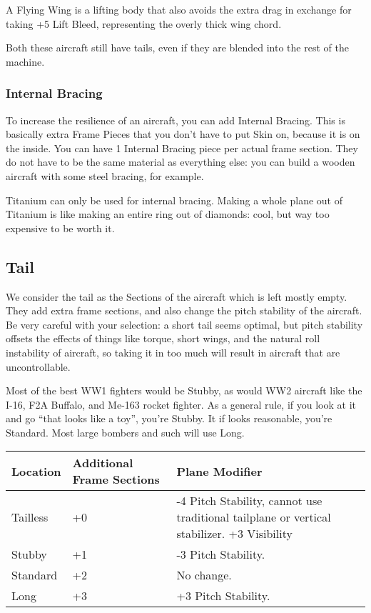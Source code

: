 \documentclass{article}
\begin{document}
A Flying Wing is a lifting body that also avoids the extra drag
in exchange for taking +5 Lift Bleed, representing the overly thick wing
chord.

Both these aircraft still have tails, even if they are blended
into the rest of the machine.

\subsubsection{Internal Bracing}
\label{_Internal Bracing}

To increase the resilience of an aircraft, you can add Internal Bracing.
This is basically extra Frame Pieces that you don't have to put Skin on,
because it is on the inside. You can have 1 Internal Bracing piece per
actual frame section. They do not have to be the same material as
everything else: you can build a wooden aircraft with some steel
bracing, for example.

Titanium can only be used for internal bracing. Making a whole plane out
of Titanium is like making an entire ring out of diamonds: cool, but way
too expensive to be worth it.

\subsection{Tail}
\label{_Tail}

We consider the tail as the Sections of the aircraft which is left
mostly empty. They add extra frame sections, and also change the pitch
stability of the aircraft. Be very careful with your selection: a short
tail seems optimal, but pitch stability offsets the effects of things
like torque, short wings, and the natural roll instability of aircraft,
so taking it in too much will result in aircraft that are
uncontrollable.

Most of the best WW1 fighters would be Stubby, as would WW2 aircraft
like the I-16, F2A Buffalo, and Me-163 rocket fighter. As a general
rule, if you look at it and go ``that looks like a toy'', you're Stubby.
It if looks reasonable, you're Standard. Most large bombers and such
will use Long.

\begin{tabular}{|l|l|l|}
    \hline
    Location & Additional Frame Sections & Plane Modifier                                          \\\hline
    Tailless & +0                        & -4 Pitch Stability, cannot use traditional tailplane or
    vertical stabilizer. +3 Visibility                                                             \\\hline
    Stubby   & +1                        & -3 Pitch Stability.                                     \\\hline
    Standard & +2                        & No change.                                              \\\hline
    Long     & +3                        & +3 Pitch Stability.                                     \\\hline
\end{tabular}
\end{document}
